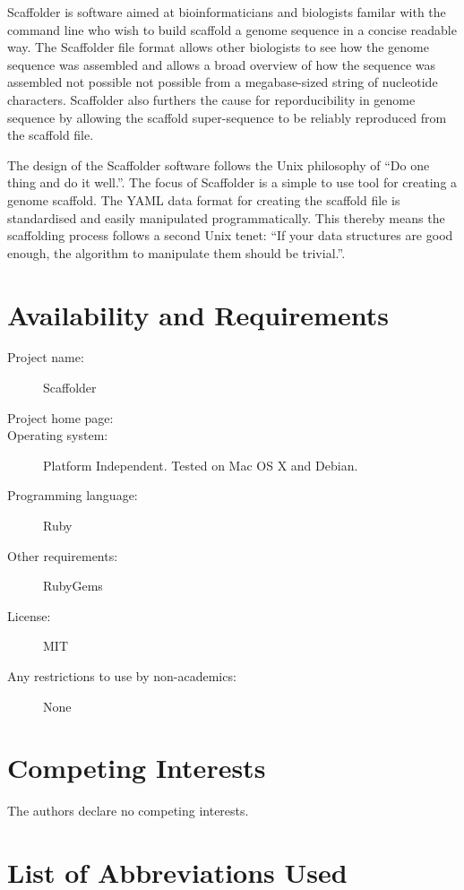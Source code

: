 \documentclass[10pt]{bmc_article}
\newenvironment{bmcformat}{\begin{raggedright}\baselineskip20pt\sloppy\setboolean{publ}{false}}{\end{raggedright}\baselineskip20pt\sloppy}
\begin{document}
\begin{bmcformat}
Scaffolder is software aimed at bioinformaticians and biologists familar with
the command line who wish to build scaffold a genome sequence in a concise
readable way. The Scaffolder file format allows other biologists to see how the
genome sequence was assembled and allows a broad overview of how the sequence
was assembled not possible not possible from a megabase-sized string of
nucleotide characters. Scaffolder also furthers the cause for reporducibility
in genome sequence by allowing the scaffold super-sequence to be reliably
reproduced from the scaffold file. \pb

The design of the Scaffolder software follows the Unix philosophy of ``Do one
thing and do it well.''. The focus of Scaffolder is a simple to use tool for
creating a genome scaffold. The YAML data format for creating the scaffold file
is standardised and easily manipulated programmatically. This thereby means the
scaffolding process follows a second Unix tenet: ``If your data structures are
good enough, the algorithm to manipulate them should be trivial.''.

\clearpage

\section*{Availability and Requirements} %

  \begin{description}
    \item[Project name:] Scaffolder
    \item[Project home page:] \scaffolder
    \item[Operating system:] Platform Independent. Tested on Mac OS X and
    Debian.
    \item[Programming language:] Ruby
    \item[Other requirements:] RubyGems
    \item[License:] MIT
    \item[Any restrictions to use by non-academics:] None
  \end{description}

\clearpage

\section*{Competing Interests} %

The authors declare no competing interests.

\section*{List of Abbreviations Used} %


\end{bmcformat}
\end{document}
